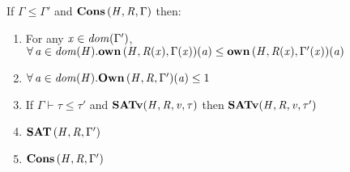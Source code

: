 \begin{lemma} %
  \label{lem:subtyp-preserves-cons}
  If $\Gamma  \leq  \Gamma'$ and $\mathbf{Cons} \, (  \mathit{H}  ,  \mathit{R}  ,  \Gamma  )$ then:
  \begin{enumerate}
  \item For any $ \mathit{x}  \in   \mathit{dom}( \Gamma' )  $, $\forall \,  \mathit{a}  \in \mathit{dom}( \mathit{H} )   .  \mathbf{own} \, (  \mathit{H}  ,  \mathit{R}  (  \mathit{x}  )  ,  \Gamma  (  \mathit{x}  )  )  (  \mathit{a}  )  \le  \mathbf{own} \, (  \mathit{H}  ,  \mathit{R}  (  \mathit{x}  )  ,  \Gamma'  (  \mathit{x}  )  )  (  \mathit{a}  )$
  \item $\forall \,  \mathit{a}  \in \mathit{dom}( \mathit{H} )   .  \mathbf{Own} \, (  \mathit{H}  ,  \mathit{R}  ,  \Gamma'  )  (  \mathit{a}  )  \le  1$
  \item If $\Gamma  \vdash  \tau  \leq  \tau'$ and $ \mathbf{SATv} ( \mathit{H} , \mathit{R} , \mathit{v} , \tau ) $ then $ \mathbf{SATv} ( \mathit{H} , \mathit{R} , \mathit{v} , \tau' ) $
  \item $\mathbf{SAT} \, (  \mathit{H}  ,  \mathit{R}  ,  \Gamma'  )$
  \item $\mathbf{Cons} \, (  \mathit{H}  ,  \mathit{R}  ,  \Gamma'  )$
  \end{enumerate}
\end{lemma}
